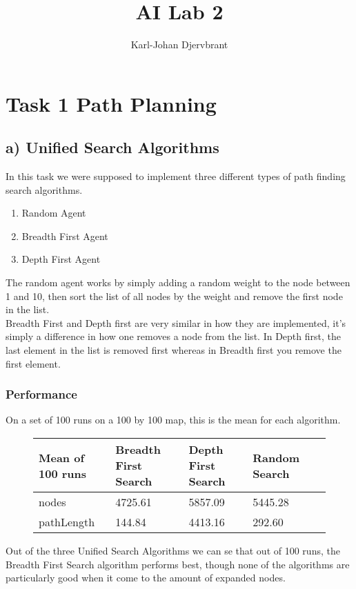 \documentclass{article}
\title{AI Lab 2}
\author{Karl-Johan Djervbrant}
\begin{document}
\maketitle

\section{Task 1 Path Planning}
\subsection{a) Unified Search Algorithms}
In this task we were supposed to implement three different types of path finding search algorithms.
\begin{enumerate}
    \item Random Agent
    \item Breadth First Agent
    \item Depth First Agent 
\end{enumerate}
The random agent works by simply adding a random weight to the node between 1 and 10, then sort the list of all nodes by the weight and remove the first node in the list.\\
Breadth First and Depth first are very similar in how they are implemented, it's simply a difference in how one removes a node from the list. In Depth first, the last element in
the list is removed first whereas in Breadth first you remove the first element.
\subsubsection{Performance}
On a set of 100 runs on a 100 by 100 map, this is the mean for each algorithm.
\begin{figure}[h]
    \center
    \begin{tabular}{llllr}
        \toprule
        {Mean of 100 runs} & {Breadth First Search} & {Depth First Search} & {Random Search} \\
        \midrule
        nodes      &  4725.61 & 5857.09 & 5445.28\\
        pathLength &   144.84 & 4413.16 & 292.60 \\
        \bottomrule
    \end{tabular}
\end{figure}

Out of the three Unified Search Algorithms we can se that out of 100 runs, the Breadth First Search algorithm performs best, though none of the algorithms are particularly good 
when it come to the amount of expanded nodes.
\end{document}
